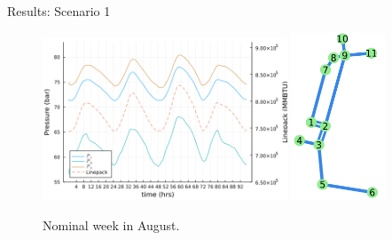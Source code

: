 \begin{frame}{Results: Scenario 1}
  \begin{figure}
    \centering
    \includegraphics[width=0.65\textwidth]{ScenarioResults/scen1.png}
    \includegraphics[width=0.25\textwidth]{reducedModel.png}
    \caption{Nominal week in August.}
  \end{figure}
\end{frame}

